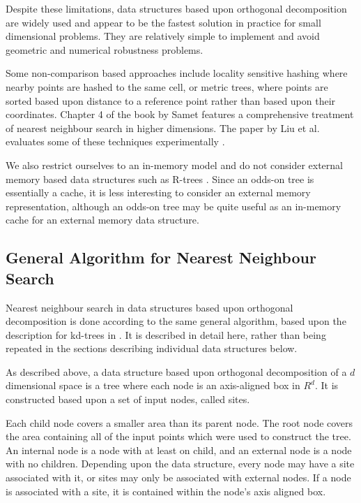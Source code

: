 \documentclass[mcs]{scsthesis}
\begin{document}
Despite these limitations, data structures based upon orthogonal decomposition
are widely used and appear to be the fastest solution in practice for small
dimensional problems. They are relatively simple to implement and avoid
geometric and numerical robustness problems. 

Some non-comparison based approaches include locality sensitive hashing
\cite{lsh} where nearby points are hashed to the same cell, or metric trees,
where points are sorted based upon distance to a reference point rather than
based upon their coordinates. Chapter 4 of the book by Samet \cite{samet}
features a comprehensive treatment of nearest neighbour search in higher
dimensions. The paper by Liu et al. evaluates some of these techniques
experimentally \cite{practicalann}. 

We also restrict ourselves to an in-memory model and do not consider external
memory based data structures such as R-trees \cite{rtree}. Since an odds-on tree
is essentially a cache, it is less interesting to consider an external memory
representation, although an odds-on tree may be quite useful as an in-memory
cache for an external memory data structure.

\subsection{General Algorithm for Nearest Neighbour Search}

Nearest neighbour search in data structures based upon orthogonal decomposition
is done according to the same general algorithm, based upon the description for
kd-trees in \cite{samet}. It is described in detail here, rather than being
repeated in the sections describing individual data structures below.

As described above, a data structure based upon orthogonal decomposition of
a $d$ dimensional space is a tree where each node is an axis-aligned box in
$R^d$. It is constructed based upon a set of input nodes, called sites.

Each child node covers a smaller area than its parent node. The root node
covers the area containing all of the input points which were used to construct
the tree. An internal node is a node with at least on child, and an external
node is a node with no children. Depending upon the data structure, every node
may have a site associated with it, or sites may only be associated with
external nodes. If a node is associated with a site, it is contained within the
node's axis aligned box.
\end{document}
